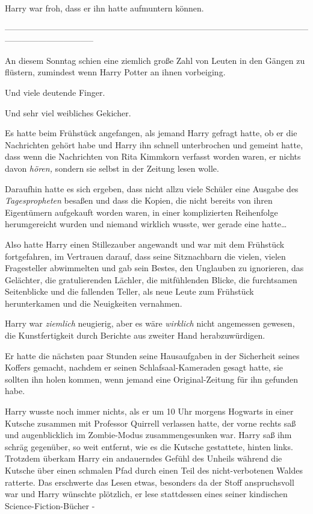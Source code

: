 {Harry war froh, dass er ihn hatte aufmuntern können.

--------------------------------------------------------------------------------------------------------------------------------------------

An diesem Sonntag schien eine ziemlich große Zahl von Leuten in den Gängen zu flüstern, zumindest wenn Harry Potter an ihnen vorbeiging.

Und viele deutende Finger.

Und sehr viel weibliches Gekicher.

Es hatte beim Frühstück angefangen, als jemand Harry gefragt hatte, ob er die Nachrichten gehört habe und Harry ihn schnell unterbrochen und gemeint hatte, dass wenn die Nachrichten von Rita Kimmkorn verfasst worden waren, er nichts davon \emph{hören,} sondern sie selbst in der Zeitung lesen wolle.

Daraufhin hatte es sich ergeben, dass nicht allzu viele Schüler eine Ausgabe des \emph{Tagespropheten} besaßen und dass die Kopien, die nicht bereits von ihren Eigentümern aufgekauft worden waren, in einer komplizierten Reihenfolge herumgereicht wurden und niemand wirklich wusste, wer gerade eine hatte…

Also hatte Harry einen Stillezauber angewandt und war mit dem Frühstück fortgefahren, im Vertrauen darauf, dass seine Sitznachbarn die vielen, vielen Fragesteller abwimmelten und gab sein Bestes, den Unglauben zu ignorieren, das Gelächter, die gratulierenden Lächler, die mitfühlenden Blicke, die furchtsamen Seitenblicke und die fallenden Teller, als neue Leute zum Frühstück herunterkamen und die Neuigkeiten vernahmen.

Harry war \emph{ziemlich} neugierig, aber es wäre \emph{wirklich} nicht angemessen gewesen, die Kunstfertigkeit durch Berichte aus zweiter Hand herabzuwürdigen.

Er hatte die nächsten paar Stunden seine Hausaufgaben in der Sicherheit seines Koffers gemacht, nachdem er seinen Schlafsaal-Kameraden gesagt hatte, sie sollten ihn holen kommen, wenn jemand eine Original-Zeitung für ihn gefunden habe.

Harry wusste noch immer nichts, als er um 10 Uhr morgens Hogwarts in einer Kutsche zusammen mit Professor Quirrell verlassen hatte, der vorne rechts saß und augenblicklich im Zombie-Modus zusammengesunken war. Harry saß ihm schräg gegenüber, so weit entfernt, wie es die Kutsche gestattete, hinten links. Trotzdem überkam Harry ein andauerndes Gefühl des Unheils während die Kutsche über einen schmalen Pfad durch einen Teil des nicht-verbotenen Waldes ratterte. Das erschwerte das Lesen etwas, besonders da der Stoff anspruchsvoll war und Harry wünschte plötzlich, er lese stattdessen eines seiner kindischen Science-Fiction-Bücher -

}

